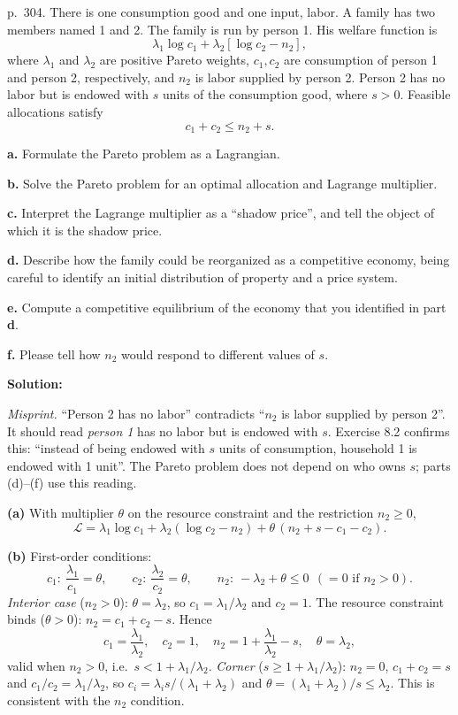 \documentclass[12pt, letterpaper]{article}
\begin{document}
\begin{tcolorbox}[oddbox,title={Exercise 8.1 \quad Family economics, I}]
\begin{tcolorbox}[questionbox]
p.~304. There is one consumption good and one input, labor. A family has two members named 1 and 2.
The family is run by person 1. His welfare function is
\[
\lambda_1\log c_1+\lambda_2[\log c_2-n_2],
\]
where $\lambda_1$ and $\lambda_2$ are positive Pareto weights, $c_1,c_2$ are consumption of person 1 and
person 2, respectively, and $n_2$ is labor supplied by person 2. Person 2 has no labor but is endowed with
$s$ units of the consumption good, where $s>0$. Feasible allocations satisfy
\[
c_1+c_2\le n_2+s.
\]

\textbf{a.} Formulate the Pareto problem as a Lagrangian.

\textbf{b.} Solve the Pareto problem for an optimal allocation and Lagrange multiplier.

\textbf{c.} Interpret the Lagrange multiplier as a ``shadow price'', and tell the object of which it is the
shadow price.

\textbf{d.} Describe how the family could be reorganized as a competitive economy, being careful to
identify an initial distribution of property and a price system.

\textbf{e.} Compute a competitive equilibrium of the economy that you identified in part \textbf{d}.

\textbf{f.} Please tell how $n_2$ would respond to different values of $s$.
\end{tcolorbox}

\textbf{Solution:}

\emph{Misprint.} ``Person 2 has no labor'' contradicts ``$n_2$ is labor supplied by person 2''. It should read
\emph{person 1} has no labor but is endowed with $s$. Exercise 8.2 confirms this: ``instead of being endowed with $s$
units of consumption, household 1 is endowed with 1 unit''. The Pareto problem does not depend on who owns $s$;
parts (d)--(f) use this reading.

\textbf{(a)} With multiplier $\theta$ on the resource constraint and the restriction $n_2\ge0$,
\[
\mathcal L=\lambda_1\log c_1+\lambda_2(\log c_2-n_2)+\theta\,(n_2+s-c_1-c_2).
\]

\textbf{(b)} First-order conditions:
\[
c_1:\ \frac{\lambda_1}{c_1}=\theta,\qquad c_2:\ \frac{\lambda_2}{c_2}=\theta,\qquad
n_2:\ -\lambda_2+\theta\le0\ \ (=0\text{ if }n_2>0).
\]
\emph{Interior case} ($n_2>0$): $\theta=\lambda_2$, so $c_1=\lambda_1/\lambda_2$ and $c_2=1$. The resource
constraint binds ($\theta>0$): $n_2=c_1+c_2-s$. Hence
\[
\boxed{c_1=\frac{\lambda_1}{\lambda_2},\quad c_2=1,\quad n_2=1+\frac{\lambda_1}{\lambda_2}-s,\quad\theta=\lambda_2,}
\]
valid when $n_2>0$, i.e.\ $s<1+\lambda_1/\lambda_2$.
\emph{Corner} ($s\ge1+\lambda_1/\lambda_2$): $n_2=0$, $c_1+c_2=s$ and $c_1/c_2=\lambda_1/\lambda_2$, so
$c_i=\lambda_is/(\lambda_1+\lambda_2)$ and $\theta=(\lambda_1+\lambda_2)/s\le\lambda_2$. This is consistent with
the $n_2$ condition.


\end{tcolorbox}
\end{document}

